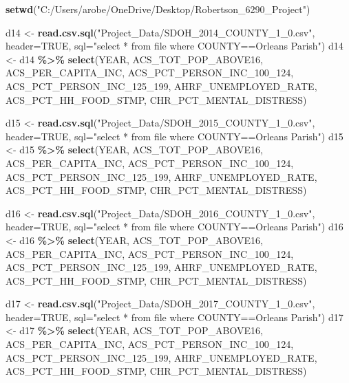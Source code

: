 \documentclass[
]{article}
\newenvironment{Shaded}{\begin{snugshade}}{\end{snugshade}}
\newcommand{\AttributeTok}[1]{\textcolor[rgb]{0.13,0.29,0.53}{#1}}
\newcommand{\ConstantTok}[1]{\textcolor[rgb]{0.56,0.35,0.01}{#1}}
\newcommand{\FunctionTok}[1]{\textcolor[rgb]{0.13,0.29,0.53}{\textbf{#1}}}
\newcommand{\NormalTok}[1]{#1}
\newcommand{\OtherTok}[1]{\textcolor[rgb]{0.56,0.35,0.01}{#1}}
\newcommand{\SpecialCharTok}[1]{\textcolor[rgb]{0.81,0.36,0.00}{\textbf{#1}}}
\newcommand{\StringTok}[1]{\textcolor[rgb]{0.31,0.60,0.02}{#1}}
\begin{document}
\begin{Shaded}
\begin{Highlighting}[]
\FunctionTok{setwd}\NormalTok{(}\StringTok{"C:/Users/arobe/OneDrive/Desktop/Robertson\_6290\_Project"}\NormalTok{)}

\NormalTok{d14 }\OtherTok{\textless{}{-}} \FunctionTok{read.csv.sql}\NormalTok{(}\StringTok{"Project\_Data/SDOH\_2014\_COUNTY\_1\_0.csv"}\NormalTok{, }\AttributeTok{header=}\ConstantTok{TRUE}\NormalTok{, }
                    \AttributeTok{sql=}\StringTok{"select * from file where COUNTY==\textquotesingle{}Orleans Parish\textquotesingle{}"}\NormalTok{)}
\NormalTok{  d14 }\OtherTok{\textless{}{-}}\NormalTok{ d14 }\SpecialCharTok{\%\textgreater{}\%} \FunctionTok{select}\NormalTok{(YEAR, ACS\_TOT\_POP\_ABOVE16, ACS\_PER\_CAPITA\_INC, ACS\_PCT\_PERSON\_INC\_100\_124, ACS\_PCT\_PERSON\_INC\_125\_199, AHRF\_UNEMPLOYED\_RATE, ACS\_PCT\_HH\_FOOD\_STMP, CHR\_PCT\_MENTAL\_DISTRESS)}

\NormalTok{d15 }\OtherTok{\textless{}{-}} \FunctionTok{read.csv.sql}\NormalTok{(}\StringTok{"Project\_Data/SDOH\_2015\_COUNTY\_1\_0.csv"}\NormalTok{, }\AttributeTok{header=}\ConstantTok{TRUE}\NormalTok{, }
                    \AttributeTok{sql=}\StringTok{"select * from  file where COUNTY==\textquotesingle{}Orleans Parish\textquotesingle{}"}\NormalTok{)}
\NormalTok{  d15 }\OtherTok{\textless{}{-}}\NormalTok{ d15 }\SpecialCharTok{\%\textgreater{}\%} \FunctionTok{select}\NormalTok{(YEAR, ACS\_TOT\_POP\_ABOVE16, ACS\_PER\_CAPITA\_INC, ACS\_PCT\_PERSON\_INC\_100\_124, ACS\_PCT\_PERSON\_INC\_125\_199, AHRF\_UNEMPLOYED\_RATE, ACS\_PCT\_HH\_FOOD\_STMP, CHR\_PCT\_MENTAL\_DISTRESS)}
  
\NormalTok{d16 }\OtherTok{\textless{}{-}} \FunctionTok{read.csv.sql}\NormalTok{(}\StringTok{"Project\_Data/SDOH\_2016\_COUNTY\_1\_0.csv"}\NormalTok{, }\AttributeTok{header=}\ConstantTok{TRUE}\NormalTok{,}
                    \AttributeTok{sql=}\StringTok{"select * from file where COUNTY==\textquotesingle{}Orleans Parish\textquotesingle{}"}\NormalTok{)}
\NormalTok{  d16 }\OtherTok{\textless{}{-}}\NormalTok{ d16 }\SpecialCharTok{\%\textgreater{}\%} \FunctionTok{select}\NormalTok{(YEAR, ACS\_TOT\_POP\_ABOVE16, ACS\_PER\_CAPITA\_INC, ACS\_PCT\_PERSON\_INC\_100\_124, ACS\_PCT\_PERSON\_INC\_125\_199, AHRF\_UNEMPLOYED\_RATE, ACS\_PCT\_HH\_FOOD\_STMP, CHR\_PCT\_MENTAL\_DISTRESS)}
  
  
\NormalTok{d17 }\OtherTok{\textless{}{-}} \FunctionTok{read.csv.sql}\NormalTok{(}\StringTok{"Project\_Data/SDOH\_2017\_COUNTY\_1\_0.csv"}\NormalTok{, }\AttributeTok{header=}\ConstantTok{TRUE}\NormalTok{, }
                    \AttributeTok{sql=}\StringTok{"select * from file where COUNTY==\textquotesingle{}Orleans Parish\textquotesingle{}"}\NormalTok{)}
\NormalTok{  d17 }\OtherTok{\textless{}{-}}\NormalTok{ d17 }\SpecialCharTok{\%\textgreater{}\%} \FunctionTok{select}\NormalTok{(YEAR, ACS\_TOT\_POP\_ABOVE16, ACS\_PER\_CAPITA\_INC, ACS\_PCT\_PERSON\_INC\_100\_124, ACS\_PCT\_PERSON\_INC\_125\_199, AHRF\_UNEMPLOYED\_RATE, ACS\_PCT\_HH\_FOOD\_STMP, CHR\_PCT\_MENTAL\_DISTRESS)}
  

\end{Highlighting}
\end{Shaded}
\end{document}
